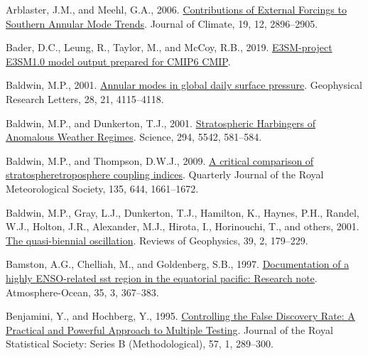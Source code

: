 \documentclass[12pt,oneside]{reedthesis}
\newlength{\cslhangindent}
\newenvironment{CSLReferences}[2] %
 {%
  \setlength{\parindent}{0pt}
  \ifodd #1 \everypar{\setlength{\hangindent}{\cslhangindent}}\ignorespaces\fi
  \ifnum #2 > 0
  \setlength{\parskip}{#2\baselineskip}
  \fi
 }%
 {}
\begin{document}
\hypertarget{refs}{}
\begin{CSLReferences}{1}{0}
\leavevmode{}%
Arblaster, J.M., and Meehl, G.A., 2006. \href{https://doi.org/10.1175/JCLI3774.1}{Contributions of {External Forcings} to {Southern Annular Mode Trends}}. Journal of Climate, 19, 12, 2896--2905.

\leavevmode{}%
Bader, D.C., Leung, R., Taylor, M., and McCoy, R.B., 2019. \href{https://doi.org/10.22033/ESGF/CMIP6.2294}{E3SM-project E3SM1.0 model output prepared for CMIP6 CMIP}.

\leavevmode{}%
Baldwin, M.P., 2001. \href{https://doi.org/10.1029/2001GL013564}{Annular modes in global daily surface pressure}. Geophysical Research Letters, 28, 21, 4115--4118.

\leavevmode{}%
Baldwin, M.P., and Dunkerton, T.J., 2001. \href{https://doi.org/10.1126/science.1063315}{Stratospheric {Harbingers} of {Anomalous Weather Regimes}}. Science, 294, 5542, 581--584.

\leavevmode{}%
Baldwin, M.P., and Thompson, D.W.J., 2009. \href{https://doi.org/10.1002/qj.479}{A critical comparison of stratosphere\textendash troposphere coupling indices}. Quarterly Journal of the Royal Meteorological Society, 135, 644, 1661--1672.

\leavevmode{}%
Baldwin, M.P., Gray, L.J., Dunkerton, T.J., Hamilton, K., Haynes, P.H., Randel, W.J., Holton, J.R., Alexander, M.J., Hirota, I., Horinouchi, T., and others, 2001. \href{https://doi.org/10.1029/1999RG000073}{The quasi-biennial oscillation}. Reviews of Geophysics, 39, 2, 179--229.

\leavevmode{}%
Bamston, A.G., Chelliah, M., and Goldenberg, S.B., 1997. \href{https://doi.org/10.1080/07055900.1997.9649597}{Documentation of a highly {ENSO}-related sst region in the equatorial pacific: {Research} note}. Atmosphere-Ocean, 35, 3, 367--383.

\leavevmode{}%
Benjamini, Y., and Hochberg, Y., 1995. \href{https://doi.org/10.1111/j.2517-6161.1995.tb02031.x}{Controlling the {False Discovery Rate}: {A Practical} and {Powerful Approach} to {Multiple Testing}}. Journal of the Royal Statistical Society: Series B (Methodological), 57, 1, 289--300.


\end{CSLReferences}
\end{document}
